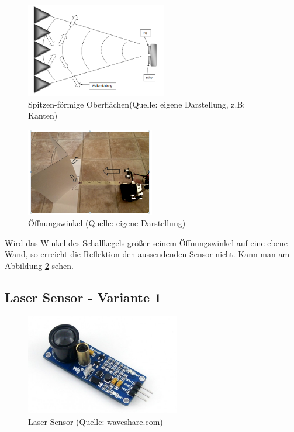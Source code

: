 \begin{figure}[!h]  %
	\centering\includegraphics[width=0.55\textwidth]{images/Bild-6.png}
	\caption{Spitzen-förmige Oberflächen\newline(Quelle: eigene Darstellung, z.B: Kanten)}
	\label{bild_6}
\end{figure}

\begin{figure}[!h]  %
	\centering\includegraphics[width=0.5\textwidth]{images/Bild-7.png}
	\caption{Öffnungswinkel (Quelle: eigene Darstellung)}
	\label{bild_7} %
\end{figure}
Wird das Winkel des Schallkegels größer seinem Öffnungswinkel auf eine ebene Wand, so erreicht die Reflektion den aussendenden Sensor nicht. Kann man am Abbildung \ref{bild_7} sehen.





\subsection{Laser Sensor - Variante 1}
\begin{figure}[!h]  %
	\centering\includegraphics[width=0.6\textwidth]{images/laser-sensor.png}
	\caption{Laser-Sensor (Quelle: waveshare.com)}
	\label{laser-sensor} %
\end{figure}

